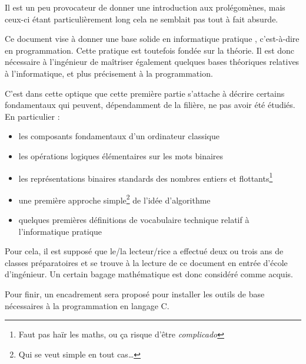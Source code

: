 \documentclass[../../main.tex]{subfiles}
\begin{document}
Il est un peu provocateur de donner une introduction aux prolégomènes, mais ceux-ci étant particulièrement long cela ne semblait pas tout à fait absurde.

Ce document vise à donner une base solide en informatique \og pratique \fg{}, c'est-à-dire en programmation.
Cette pratique est toutefois fondée sur la théorie. Il est donc nécessaire à l'ingénieur de maîtriser
également quelques bases théoriques relatives à l'informatique, et plus précisement à la programmation.

C'est dans cette optique que cette première partie s'attache à décrire certains fondamentaux qui
peuvent, dépendamment de la filière, ne pas avoir été étudiés. En particulier :
\begin{itemize}
	\item les composants fondamentaux d'un ordinateur classique
	\item les opérations logiques élémentaires sur les mots binaires
	\item les représentations binaires standards des nombres entiers et flottants\footnote{Faut pas haïr les maths, ou ça risque d'être \textit{complicado}}
	\item une première approche simple\footnote{Qui se veut simple en tout cas\dots} de l'idée d'algorithme
	\item quelques premières définitions de vocabulaire technique relatif à l'informatique pratique
\end{itemize}
Pour cela, il est supposé que le/la lecteur/rice a effectué deux ou trois ans de classes préparatoires et
se trouve à la lecture de ce document en entrée d'école d'ingénieur. Un certain bagage mathématique
est donc considéré comme acquis.

Pour finir, un encadrement sera proposé pour installer les outils de base nécessaires à la programmation
en langage C.

\hrulefill
\newpage
\end{document}
